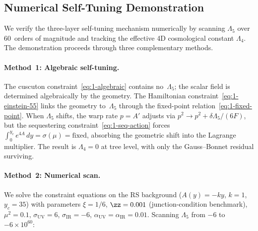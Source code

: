 \subsection{Numerical Self-Tuning Demonstration}
\label{sec:1-self-tuning-numerical}

We verify the three-layer self-tuning mechanism numerically by scanning $\Lambda_5$ over 60~orders of magnitude and tracking the effective 4D cosmological constant $\Lambda_4$. The demonstration proceeds through three complementary methods.

\paragraph{Method~1: Algebraic self-tuning.} The cuscuton constraint~\eqref{eq:1-algebraic} contains no~$\Lambda_5$; the scalar field is determined algebraically by the geometry. The Hamiltonian constraint~\eqref{eq:1-einstein-55} links the geometry to~$\Lambda_5$ through the fixed-point relation~\eqref{eq:1-fixed-point}. When $\Lambda_5$ shifts, the warp rate $p = A'$ adjusts via $p^2 \to p^2 + \delta\Lambda_5/(6F)$, but the sequestering constraint~\eqref{eq:1-seq-action} forces $\int_0^{y_c} e^{4A}\,dy = \sigma(\mu) = \mathrm{fixed}$, absorbing the geometric shift into the Lagrange multiplier. The result is $\Lambda_4 = 0$ at tree level, with only the Gauss--Bonnet residual surviving.

\paragraph{Method~2: Numerical scan.} We solve the constraint equations on the RS background ($A(y) = -ky$, $k = 1$, $y_c = 35$) with parameters $\xi = 1/6$, $\zz = 0.001$ (junction-condition benchmark), $\mu^2 = 0.1$, $\sigma_{\mathrm{UV}} = 6$, $\sigma_{\mathrm{IR}} = -6$, $\alpha_{\mathrm{UV}} = \alpha_{\mathrm{IR}} = 0.01$. Scanning $\Lambda_5$ from $-6$ to $-6 \times 10^{60}$:


